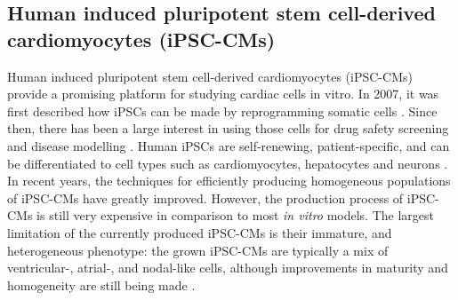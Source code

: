 \documentclass{article}
\begin{document}
\subsection{Human induced pluripotent stem cell-derived cardiomyocytes (iPSC-CMs)}
Human induced pluripotent stem cell-derived cardiomyocytes (iPSC-CMs) provide a promising platform for studying cardiac cells in vitro. In 2007, it was first described how iPSCs can be made by reprogramming somatic cells \cite{Takahashi2007}. Since then, there has been a large interest in using those cells for drug safety screening and disease modelling \cite{Sallam2016}. Human iPSCs are self-renewing, patient-specific, and can be differentiated to cell types such as cardiomyocytes, hepatocytes and neurons \cite{Rajamohan2013}. In recent years, the techniques for efficiently producing homogeneous populations of iPSC-CMs  have greatly improved. However, the production process of iPSC-CMs is still very expensive in comparison to most \textit{in vitro} models. The largest limitation of the currently produced iPSC-CMs is their immature, and heterogeneous phenotype: the grown iPSC-CMs are typically a mix of ventricular-, atrial-, and nodal-like cells, although improvements in maturity and homogeneity are still being made \cite{Denning2016}. 
%
\end{document}
